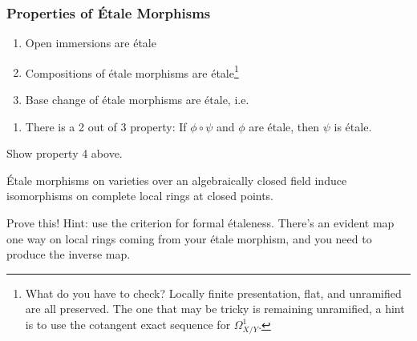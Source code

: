 \hypertarget{properties-of-uxe9tale-morphisms}{%
\subsubsection{Properties of Étale
Morphisms}\label{properties-of-uxe9tale-morphisms}}

\begin{proposition}

\envlist

\begin{enumerate}
\def\labelenumi{\arabic{enumi}.}
\tightlist
\item
  Open immersions are étale
\item
  Compositions of étale morphisms are étale\footnote{What do you have to
    check? Locally finite presentation, flat, and unramified are all
    preserved. The one that may be tricky is remaining unramified, a
    hint is to use the cotangent exact sequence for \(\Omega^1_{X/Y}\).}
\item
  Base change of étale morphisms are étale, i.e.~
\end{enumerate}

\begin{enumerate}
\def\labelenumi{\arabic{enumi}.}
\setcounter{enumi}{3}
\tightlist
\item
  There is a 2 out of 3 property: If \(\phi \circ \psi\) and \(\phi\)
  are étale, then \(\psi\) is étale.
\end{enumerate}

\end{proposition}

\begin{exercise}[?]

Show property 4 above.

\end{exercise}

\begin{proposition}[?]

Étale morphisms on varieties over an algebraically closed field induce
isomorphisms on complete local rings at closed points.

\end{proposition}

\begin{exercise}[?]

Prove this! Hint: use the criterion for formal étaleness. There's an
evident map one way on local rings coming from your étale morphism, and
you need to produce the inverse map.

\end{exercise}

